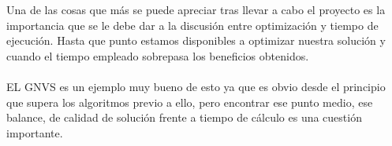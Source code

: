 Una de las cosas que más se puede apreciar tras llevar a cabo el proyecto es la importancia que se le debe dar a la discusión entre optimización y tiempo de ejecución. Hasta que punto estamos disponibles a optimizar nuestra solución y cuando el tiempo empleado sobrepasa los beneficios obtenidos. 
\\
\\
EL GNVS es un ejemplo muy bueno de esto ya que es obvio desde el principio que supera los algoritmos previo a ello, pero encontrar ese punto medio, ese balance, de calidad de solución frente a tiempo de cálculo es una cuestión importante.